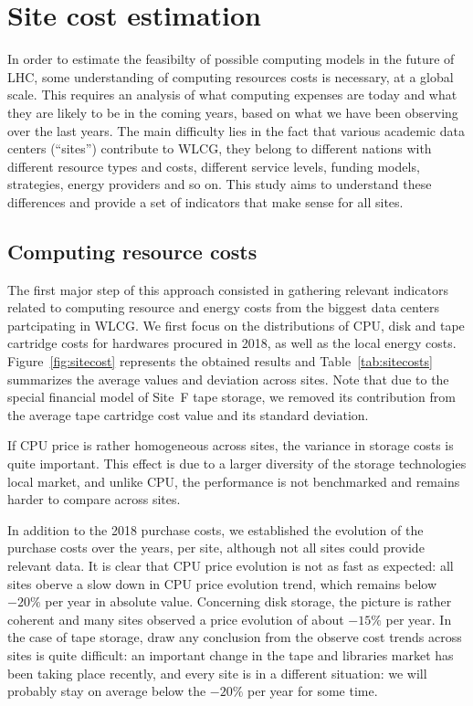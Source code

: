 \section{Site cost estimation}

In order to estimate the feasibilty of possible computing models in the future of LHC, some understanding
of computing resources costs is necessary, at a global scale.
This requires an analysis of what computing expenses are today and what they are likely to be in the coming years, based on
what we have been observing over the last years.
The main difficulty lies in the fact that various academic data centers (``sites'') contribute to WLCG, they belong
to different nations with different resource types and costs, different service levels, funding models,
strategies, energy providers and so on. This study aims to understand these differences and provide a set of indicators
that make sense for all sites.


\subsection{\label{sec:sitecost:computing}Computing resource costs}

The first major step of this approach consisted in gathering relevant indicators related to computing resource and energy costs
from the biggest data centers partcipating in WLCG.
We first focus on the distributions of CPU, disk and tape cartridge costs for hardwares procured in 2018, as well as the
local energy costs.
Figure~\ref{fig:sitecost} represents the obtained results and Table~\ref{tab:sitecosts} summarizes the average values
and deviation across sites. Note that due to the special financial model of Site~F tape storage, we removed its contribution
from the average tape cartridge cost value and its standard deviation.

If CPU price is rather homogeneous across sites, the variance
in storage costs is quite important. This effect is due to a larger diversity of the storage technologies local market,
and unlike CPU, the performance is not benchmarked and remains harder to compare across sites.

In addition to the 2018 purchase costs, we established the evolution of the purchase costs over the years, per site,
although not all sites could provide relevant data. It is clear that CPU price evolution is not as fast as expected: all
sites oberve a slow down in CPU price evolution trend, which remains below $-20 \%$ per year in absolute value.
Concerning disk storage, the picture is rather coherent and many sites
observed a price evolution of about $-15 \%$ per year.
In the case of tape storage, draw any conclusion from the observe cost trends across sites is quite difficult:
an important change in the tape and libraries market has been taking place recently, and every site is in a different
situation: we will probably stay on average below the $-20 \%$ per year for some time.

